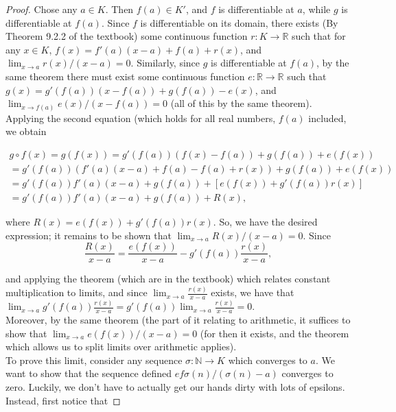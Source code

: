 \documentclass[11pt]{article}
\newcommand{\R}{\mathbb{R}}
\newcommand{\N}{\mathbb{N}}
\theoremstyle{definition}
\begin{document}
\begin{proof} 

Chose any \(a\in K\). Then \(f(a)\in K'\), and \(f\) is differentiable at \(a\), while \(g\) is differentiable at \(f(a)\). Since \(f\) is differentiable on its domain, there exists (By Theorem 9.2.2 of the textbook) some continuous function \(r:K\to \R\) such that for any $x\in K$, $f(x) = f'(a)(x-a) + f(a) + r(x)$, and $\lim_{x\to a}r(x)/(x-a) = 0$. Similarly, since $g$ is differentiable at $f(a)$, by the same theorem there must exist some continuous function $e:\R\to\R$ such that 
$g(x) = g'(f(a))(x- f(a)) + g(f(a)) - e(x)$, and $\lim_{x\to f(a)}e(x)/(x-f(a)) = 0$ (all of this by the same theorem).
\\

Applying the second equation (which holds for all real numbers, $f(a)$ included, we obtain

\begin{align}
 g\circ f(x) = g(f(x)) = g'(f(a))(f(x) - f(a)) + g(f(a)) + e(f(x)) \\
 = g'(f(a))(f'(a)(x-a) + f(a) - f(a) + r(x)) + g(f(a)) + e(f(x))\\
 = g'(f(a))f'(a)(x - a) + g(f(a)) + [e(f(x)) + g'(f(a))r(x)]\\
 = g'(f(a))f'(a)(x-a) + g(f(a)) + R(x),
\end{align}

where $R(x) = e(f(x)) + g'(f(a))r(x)$. So, we have the desired expression; it remains to be shown that $\lim_{x\to a}R(x)/(x-a) = 0$. Since 
\[
\frac{R(x)}{x-a} = \frac{e(f(x))}{x-a} - g'(f(a))\frac{r(x)}{x-a}, 
\]

and applying the theorem (which are in the textbook) which relates constant multiplication to limits, and since $\lim_{x\to a} \frac{r(x)}{x-a}$ exists, we have that $\lim_{x\to a} g'(f(a))\frac{r(x)}{x-a} = g'(f(a))\lim_{x\to a} \frac{r(x)}{x-a} = 0$.
\\

Moreover, by the same theorem (the part of it relating to arithmetic, it suffices to show that $\lim_{x\to a}e(f(x))/(x-a) = 0$ (for then it exists, and the theorem which allows us to split limits over arithmetic applies).\\

To prove this limit, consider any sequence $\sigma:\N \to K$ which converges to $a$. We want to show that the sequence defined $ ef\sigma(n)/(\sigma(n) - a)$ converges to zero. Luckily, we don't have to actually get our hands dirty with lots of epsilons. Instead, first notice that


\end{proof}
\end{document}
